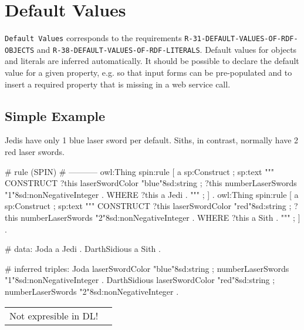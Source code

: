 \documentclass{llncs}
\newcommand{\ms}[1]{\texttt{#1}}
\newenvironment{DL}{
  \vspace{0cm}
	\begin{center}
  \begin{tabular}{r l}

}{
  \end{tabular}
	\end{center}
}
\begin{document}
\section{Default Values}

\ms{Default Values} corresponds to the requirements
\ms{R-31-DEFAULT-VALUES-OF-RDF-} \ms{OBJECTS} and
\ms{R-38-DEFAULT-VALUES-OF-RDF-LITERALS}.
Default values for objects and literals are inferred automatically.
It should be possible to declare the default value for a given property, e.g. so that input forms can be pre-populated and to insert a required property that is missing in a web service call. 

\subsection{Simple Example}

Jedis have only 1 blue laser sword per default.
Siths, in contrast, normally have 2 red laser swords.

\begin{ex}
# rule (SPIN)
# -----------
owl:Thing
    spin:rule [
        a sp:Construct ;
            sp:text """
                CONSTRUCT {            
                    ?this laserSwordColor "blue"^^xsd:string ;
                    ?this numberLaserSwords "1"^^xsd:nonNegativeInteger . 
                }
                WHERE {             
                    ?this a Jedi .            
                } """ ; ] .
owl:Thing
    spin:rule [
        a sp:Construct ;
            sp:text """
                CONSTRUCT {
                    ?this laserSwordColor "red"^^xsd:string ;
                    ?this numberLaserSwords "2"^^xsd:nonNegativeInteger . 
                }
                WHERE {             
                    ?this a Sith .            
                } """ ; ] .
\end{ex}

\begin{ex}
# data:
Joda a Jedi .
DarthSidious a Sith .
\end{ex}

\begin{ex}
# inferred triples:
Joda 
    laserSwordColor "blue"^^xsd:string ;
    numberLaserSwords "1"^^xsd:nonNegativeInteger .
DarthSidious 
    laserSwordColor "red"^^xsd:string ;
    numberLaserSwords "2"^^xsd:nonNegativeInteger .
\end{ex}

\begin{DL}
Not expresible in DL!
\end{DL}
\end{document}
